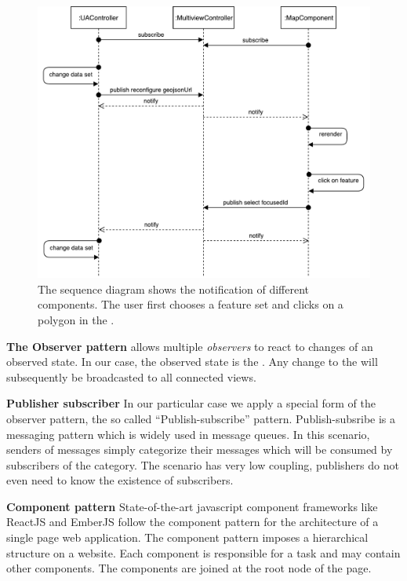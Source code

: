 \begin{figure}[ht]
  \centering
  \includegraphics[width=\textwidth]{figures/implementation/SequenceDiagram}
  \caption{%
    The sequence diagram shows the notification of different components.
  The user first chooses a feature set and clicks on a polygon in the \gv{}.
  }\label{fig:implementation:sequence-diagram}
\end{figure}


\textbf{The Observer pattern} allows multiple \emph{observers} to react to changes of an observed state.
In our case, the observed state is the .
Any change to the  will subsequently be broadcasted to all connected views.


\textbf{Publisher subscriber}
In our particular case we apply a special form of the observer pattern, the so called ``Publish-subscribe'' pattern\cite{Eugster2003}.
Publish-subsribe is a messaging pattern which is widely used in message queues.
In this scenario, senders of messages simply categorize their messages which will be consumed by subscribers of the category.
The scenario has very low coupling, publishers do not even need to know the existence of subscribers.

\textbf{Component pattern}
State-of-the-art javascript component frameworks like ReactJS and EmberJS follow the component pattern for the architecture of a single page web application.
The component pattern imposes a hierarchical structure on a website.
Each component is responsible for a task and may contain other components.
The components are joined at the root node of the page.

